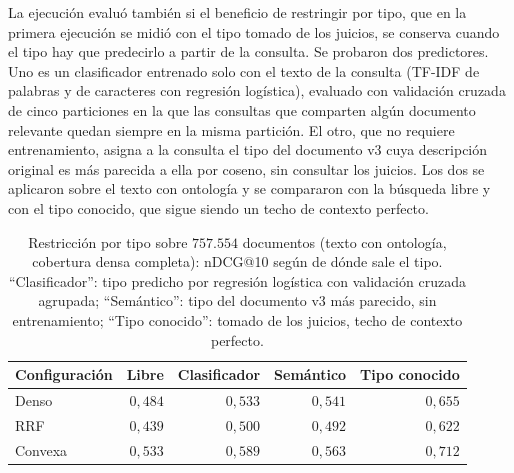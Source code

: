 \documentclass[11pt,letterpaper]{article}
\numberwithin{equation}{section}
\begin{document}
La ejecución evaluó también si el beneficio de restringir por tipo, que en la primera ejecución se midió con el tipo tomado de los juicios, se conserva cuando el tipo hay que predecirlo a partir de la consulta. Se probaron dos predictores. Uno es un clasificador entrenado solo con el texto de la consulta (TF-IDF de palabras y de caracteres con regresión logística), evaluado con validación cruzada de cinco particiones en la que las consultas que comparten algún documento relevante quedan siempre en la misma partición. El otro, que no requiere entrenamiento, asigna a la consulta el tipo del documento v3 cuya descripción original es más parecida a ella por coseno, sin consultar los juicios. Los dos se aplicaron sobre el texto con ontología y se compararon con la búsqueda libre y con el tipo conocido, que sigue siendo un techo de contexto perfecto.

\begin{table}[htbp]
\centering
\footnotesize
\setlength{\tabcolsep}{6pt}
\renewcommand{\arraystretch}{1.15}
\caption{Restricción por tipo sobre $757.554$ documentos (texto con ontología, cobertura densa completa): nDCG@10 según de dónde sale el tipo. ``Clasificador'': tipo predicho por regresión logística con validación cruzada agrupada; ``Semántico'': tipo del documento v3 más parecido, sin entrenamiento; ``Tipo conocido'': tomado de los juicios, techo de contexto perfecto.}
\label{tab:validacion-ruta}
\begin{tabularx}{\textwidth}{@{}Y r r r r@{}}
\toprule
\textbf{Configuración} & \textbf{Libre} & \textbf{Clasificador} & \textbf{Semántico} & \textbf{Tipo conocido} \\
\midrule
Denso & $0{,}484$ & $0{,}533$ & $0{,}541$ & $0{,}655$ \\
RRF & $0{,}439$ & $0{,}500$ & $0{,}492$ & $0{,}622$ \\
Convexa & $0{,}533$ & $0{,}589$ & $0{,}563$ & $0{,}712$ \\
\bottomrule
\end{tabularx}
\end{table}
\end{document}
